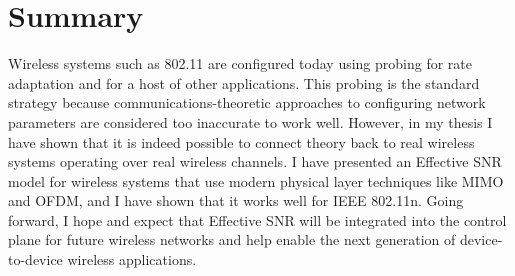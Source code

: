 \section{Summary}
Wireless systems such as 802.11 are configured today using probing for rate adaptation and for a host of other applications. This probing is the standard strategy because communications-theoretic approaches to configuring network parameters are considered too inaccurate to work well. However, in my thesis I have shown that it is indeed possible to connect theory back to real wireless systems operating over real wireless channels. I have presented an Effective SNR model for wireless systems that use modern physical layer techniques like MIMO and OFDM, and I have shown that it works well for IEEE 802.11n. Going forward, I hope and expect that Effective SNR will be integrated into the control plane for future wireless networks and help enable the next generation of device-to-device wireless applications.

\ifx\mainfile\undefined

\fi

